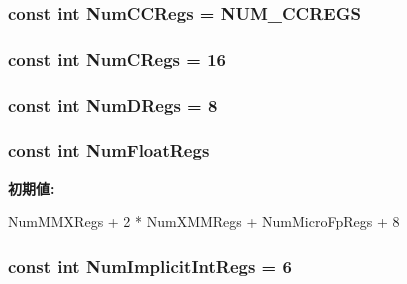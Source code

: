 \label{namespaceX86ISA_afd38951fdccb8fcb42b2f42cac8c7d61}
\hypertarget{namespaceX86ISA_a717317b863009b3e1b683c3bdddb9fd3}{
\subsubsection[{NumCCRegs}]{\setlength{\rightskip}{0pt plus 5cm}const int {\bf NumCCRegs} = NUM\_\-CCREGS}}
\label{namespaceX86ISA_a717317b863009b3e1b683c3bdddb9fd3}
\hypertarget{namespaceX86ISA_aa7b00e7134e61bbf5bb84a64b1897ede}{
\subsubsection[{NumCRegs}]{\setlength{\rightskip}{0pt plus 5cm}const int {\bf NumCRegs} = 16}}
\label{namespaceX86ISA_aa7b00e7134e61bbf5bb84a64b1897ede}
\hypertarget{namespaceX86ISA_ad71fd402e58f9dee6b8ded9632536fcd}{
\subsubsection[{NumDRegs}]{\setlength{\rightskip}{0pt plus 5cm}const int {\bf NumDRegs} = 8}}
\label{namespaceX86ISA_ad71fd402e58f9dee6b8ded9632536fcd}
\hypertarget{namespaceX86ISA_a627b25288f2452be107872a138df8b85}{
\subsubsection[{NumFloatRegs}]{\setlength{\rightskip}{0pt plus 5cm}const int {\bf NumFloatRegs}}}
\label{namespaceX86ISA_a627b25288f2452be107872a138df8b85}
{\bfseries 初期値:}
\begin{DoxyCode}

    NumMMXRegs + 2 * NumXMMRegs + NumMicroFpRegs + 8
\end{DoxyCode}
\hypertarget{namespaceX86ISA_a7e051dc96074ceadda53ac54735a2181}{
\subsubsection[{NumImplicitIntRegs}]{\setlength{\rightskip}{0pt plus 5cm}const int {\bf NumImplicitIntRegs} = 6}}
